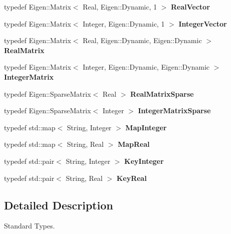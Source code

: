 \begin{DoxyCompactItemize}
\item 
\hypertarget{namespaceUtils_aa88ae93984308e5b854332db5221deb6}{
typedef Eigen::Matrix$<$ Real, Eigen::Dynamic, 1 $>$ {\bfseries RealVector}}
\label{namespaceUtils_aa88ae93984308e5b854332db5221deb6}

\item 
\hypertarget{namespaceUtils_a915d70599a8283137caf67f826df9c82}{
typedef Eigen::Matrix$<$ Integer, Eigen::Dynamic, 1 $>$ {\bfseries IntegerVector}}
\label{namespaceUtils_a915d70599a8283137caf67f826df9c82}

\item 
\hypertarget{namespaceUtils_ae9ae5cf5dae5e0f4a344ea8431980ee5}{
typedef Eigen::Matrix$<$ Real, Eigen::Dynamic, Eigen::Dynamic $>$ {\bfseries RealMatrix}}
\label{namespaceUtils_ae9ae5cf5dae5e0f4a344ea8431980ee5}

\item 
\hypertarget{namespaceUtils_a5c11b253bdb786680effd33724e71a4b}{
typedef Eigen::Matrix$<$ Integer, Eigen::Dynamic, Eigen::Dynamic $>$ {\bfseries IntegerMatrix}}
\label{namespaceUtils_a5c11b253bdb786680effd33724e71a4b}

\item 
\hypertarget{namespaceUtils_a9a2b557f505f73caa28656506540fc66}{
typedef Eigen::SparseMatrix$<$ Real $>$ {\bfseries RealMatrixSparse}}
\label{namespaceUtils_a9a2b557f505f73caa28656506540fc66}

\item 
\hypertarget{namespaceUtils_ad826ceac3e653415a2ca5ecf56e551aa}{
typedef Eigen::SparseMatrix$<$ Integer $>$ {\bfseries IntegerMatrixSparse}}
\label{namespaceUtils_ad826ceac3e653415a2ca5ecf56e551aa}

\item 
\hypertarget{namespaceUtils_a7d3f6d6d13e7f526f20e65aa2b8a15e2}{
typedef std::map$<$ String, Integer $>$ {\bfseries MapInteger}}
\label{namespaceUtils_a7d3f6d6d13e7f526f20e65aa2b8a15e2}

\item 
\hypertarget{namespaceUtils_abcddb9a0bb364d291308b9464f091f0d}{
typedef std::map$<$ String, Real $>$ {\bfseries MapReal}}
\label{namespaceUtils_abcddb9a0bb364d291308b9464f091f0d}

\item 
\hypertarget{namespaceUtils_afffa6a7a8c2175ec82282ec809dedabe}{
typedef std::pair$<$ String, Integer $>$ {\bfseries KeyInteger}}
\label{namespaceUtils_afffa6a7a8c2175ec82282ec809dedabe}

\item 
\hypertarget{namespaceUtils_a4d5243d00623ae4be7caddde087f23bd}{
typedef std::pair$<$ String, Real $>$ {\bfseries KeyReal}}
\label{namespaceUtils_a4d5243d00623ae4be7caddde087f23bd}

\end{DoxyCompactItemize}


\subsection{Detailed Description}
Standard Types. 